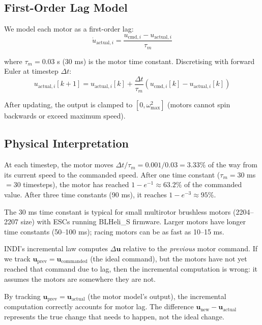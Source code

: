 \documentclass[12pt, a4paper]{article}
\newcommand{\bu}{\bm{u}}
\begin{document}
\subsection{First-Order Lag Model}

We model each motor as a first-order lag:
\begin{equation}
    \dot{u}_{\text{actual},i} = \frac{u_{\text{cmd},i} - u_{\text{actual},i}}{\tau_m}
\end{equation}

where $\tau_m = 0.03$ s (30 ms) is the motor time constant.  Discretising with forward Euler at timestep $\Delta t$:
\begin{equation}
    u_{\text{actual},i}[k+1] = u_{\text{actual},i}[k] + \frac{\Delta t}{\tau_m} \left( u_{\text{cmd},i}[k] - u_{\text{actual},i}[k] \right)
\end{equation}

After updating, the output is clamped to $[0, \omega_{\max}^2]$ (motors cannot spin backwards or exceed maximum speed).

\subsection{Physical Interpretation}

At each timestep, the motor moves $\Delta t / \tau_m = 0.001 / 0.03 = 3.33\%$ of the way from its current speed to the commanded speed.  After one time constant ($\tau_m = 30$ ms $= 30$ timesteps), the motor has reached $1 - e^{-1} \approx 63.2\%$ of the commanded value.  After three time constants (90 ms), it reaches $1 - e^{-3} \approx 95\%$.

The 30 ms time constant is typical for small multirotor brushless motors (2204--2207 size) with ESCs running BLHeli\_S firmware.  Larger motors have longer time constants (50--100 ms); racing motors can be as fast as 10--15 ms.

INDI's incremental law computes $\Delta\bu$ relative to the \emph{previous} motor command.  If we track $\bu_{\text{prev}} = \bu_{\text{commanded}}$ (the ideal command), but the motors have not yet reached that command due to lag, then the incremental computation is wrong: it assumes the motors are somewhere they are not.

By tracking $\bu_{\text{prev}} = \bu_{\text{actual}}$ (the motor model's output), the incremental computation correctly accounts for motor lag.  The difference $\bu_{\text{new}} - \bu_{\text{actual}}$ represents the true change that needs to happen, not the ideal change.
\end{document}
